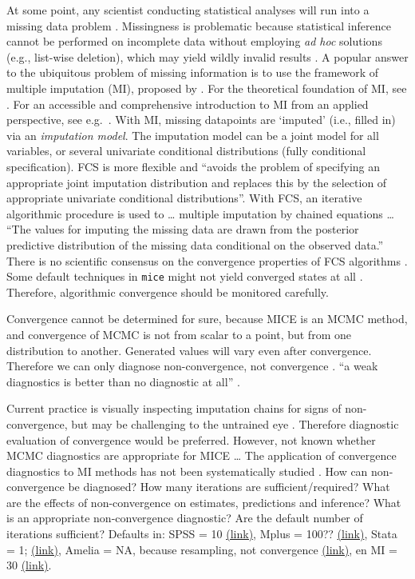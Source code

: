 \documentclass[Royal,times,sageh]{sagej}
\begin{document}
At some point, any scientist conducting statistical analyses will run
into a missing data problem \citep{alli02}. Missingness is problematic
because statistical inference cannot be performed on incomplete data
without employing \emph{ad hoc} solutions (e.g., list-wise deletion),
which may yield wildly invalid results \citep{buur18}. A popular answer
to the ubiquitous problem of missing information is to use the framework
of multiple imputation (MI), proposed by \citet{rubin87}. For the
theoretical foundation of MI, see \citet{rubin87}. For an accessible and
comprehensive introduction to MI from an applied perspective, see
e.g.~\citet{buur18}. With MI, missing datapoints are `imputed' (i.e.,
filled in) via an \emph{imputation model}. The imputation model can be a
joint model for all variables, or several univariate conditional
distributions (fully conditional specification). FCS is more flexible
and ``avoids the problem of specifying an appropriate joint imputation
distribution and replaces this by the selection of appropriate
univariate conditional distributions''. With FCS, an iterative
algorithmic procedure is used to \ldots{} multiple imputation by chained
equations \ldots{} ``The values for imputing the missing data are drawn
from the posterior predictive distribution of the missing data
conditional on the observed data.'' There is no scientific consensus on
the convergence properties of FCS algorithms \citep{taka17}. Some
default techniques in \texttt{mice} might not yield converged states at
all \citep{murr18}. Therefore, algorithmic convergence should be
monitored carefully.

Convergence cannot be determined for sure, because MICE is an MCMC
method, and convergence of MCMC is not from scalar to a point, but from
one distribution to another. Generated values will vary even after
convergence. Therefore we can only diagnose non-convergence, not
convergence \citep{hoff09}. ``a weak diagnostics is better than no
diagnostic at all'' \citep{cowl96}.

Current practice is visually inspecting imputation chains for signs of
non-convergence, but may be challenging to the untrained eye
\citep[\(\S\) 6.5.2]{buur18}. Therefore diagnostic evaluation of
convergence would be preferred. However, not known whether MCMC
diagnostics are appropriate for MICE \ldots{} The application of
convergence diagnostics to MI methods has not been systematically
studied \citep{buur18}. How can non-convergence be diagnosed? How many
iterations are sufficient/required? What are the effects of
non-convergence on estimates, predictions and inference? What is an
appropriate non-convergence diagnostic? Are the default number of
iterations sufficient? Defaults in: SPSS = 10
\href{https://www.ibm.com/support/knowledgecenter/SSLVMB_24.0.0/spss/mva/syn_multiple_imputation_impute.html}{(link)},
Mplus = 100??
\href{https://pdfs.semanticscholar.org/e20e/29e008592cbfbaa567931f74cdfdb5451405.pdf?_ga=2.55354671.54033656.1584698748-527613517.1584698748}{(link)},
Stata = 1;
\href{https://www.stata.com/manuals13/mi.pdf,\%20p.\%20139}{(link)},
Amelia = NA, because resampling, not convergence
\href{https://cran.r-project.org/web/packages/Amelia/Amelia.pdf}{(link)},
en MI = 30
\href{https://cran.r-project.org/web/packages/mi/mi.pdf}{(link)}.
\end{document}
